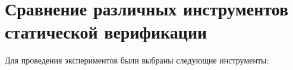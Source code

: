 %
%

\section{Сравнение различных инструментов статической верификации}

Для проведения экспериментов были выбраны следующие инструменты:

